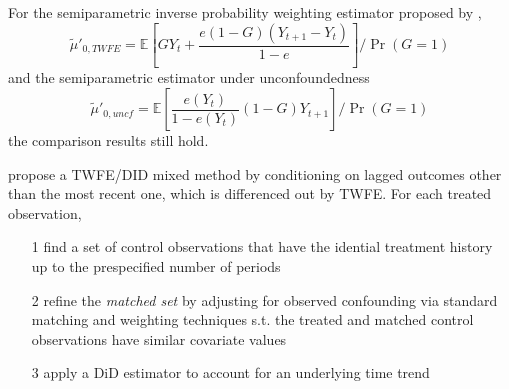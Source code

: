 \documentclass[twoside]{article}
\begin{document}
For the semiparametric inverse probability weighting estimator proposed by \citet{abadie2005semiparametric},
\begin{equation*}
    \tilde{\mu}'_{0,TWFE} = \mathbb{E} \left[GY_t + \frac{e(1-G)\left(Y_{t+1}-Y_t\right)}{1-e}\right]/\Pr\left(G=1\right)
\end{equation*}
and the semiparametric estimator under unconfoundedness
\begin{equation*}
    \tilde{\mu}'_{0,uncf} = \mathbb{E} \left[\frac{e(Y_t)}{1-e(Y_t)}(1-G)Y_{t+1}\right]/\Pr\left(G=1\right)
\end{equation*}
the comparison results still hold.

\citet{imai2023matching} propose a TWFE/DID mixed method by conditioning on lagged outcomes other than the most recent one, which is differenced out by TWFE. For each treated observation, 
\begin{itemize}
    \item[1] find a set of control observations that have the idential treatment history up to the prespecified number of periods
    \item[2] refine the \textit{matched set} by adjusting for observed confounding via standard matching and weighting techniques s.t. the treated and matched control observations have similar covariate values 
    \item[3] apply a DiD estimator to account for an underlying time trend
\end{itemize}
\end{document}
